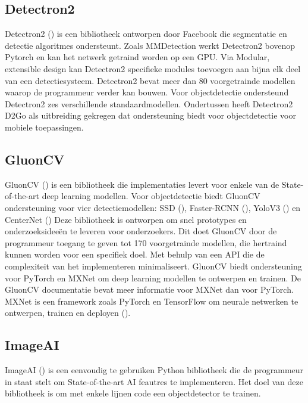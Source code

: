 \subsection{Detectron2}
Detectron2 (\cite{wu2019detectron2}) is een bibliotheek ontworpen door Facebook die segmentatie en detectie algoritmes ondersteunt.
Zoals MMDetection werkt Detectron2 bovenop Pytorch en kan het netwerk getraind worden op een GPU.
Via Modular, extensible design kan Detectron2 specifieke modules toevoegen aan bijna elk deel van een detectiesysteem.
Detectron2 bevat meer dan 80 voorgetrainde modellen waarop de programmeur verder kan bouwen.
Voor objectdetectie ondersteund Detectron2 zes verschillende standaardmodellen.
Ondertussen heeft Detectron2 D2Go als uitbreiding gekregen dat ondersteuning biedt voor objectdetectie voor mobiele toepassingen.

\subsection{GluonCV}
GluonCV (\cite{guo_gluoncv_2020}) is een bibliotheek die implementaties levert voor enkele van de State-of-the-art deep learning modellen.
Voor objectdetectie biedt GluonCV ondersteuning voor vier detectiemodellen: SSD (\cite{liu_ssd_2016}), Faster-RCNN (\cite{ren_faster_2016}), YoloV3 (\cite{redmon_yolov3_2018}) en CenterNet (\cite{duan_centernet_2019})
Deze bibliotheek is ontworpen om snel prototypes en onderzoeksidee\"en te leveren voor onderzoekers.
Dit doet GluonCV door de programmeur toegang te geven tot 170 voorgetrainde modellen, die hertraind kunnen worden voor een specifiek doel.
Met behulp van een API die de complexiteit van het implementeren minimaliseert.
GluonCV biedt ondersteuning voor PyTorch en MXNet om deep learning modellen te ontwerpen en trainen.
De GluonCV documentatie bevat meer informatie voor MXNet dan voor PyTorch.
MXNet is een framework zoals PyTorch en TensorFlow om neurale netwerken te ontwerpen, trainen en deployen (\cite{chen_mxnet_2015}).

\subsection{ImageAI}
ImageAI (\cite{martins_imageai_2021}) is een eenvoudig te gebruiken Python bibliotheek die de programmeur in staat stelt om State-of-the-art AI feautres te implementeren.
Het doel van deze bibliotheek is om met enkele lijnen code een objectdetector te trainen.

